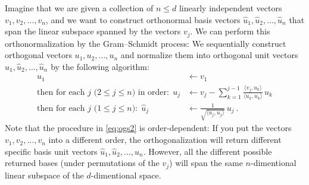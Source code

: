 \documentclass{article}
\newcommand{\inner}[2]{\langle{#1},{#2}\rangle}
\begin{document}
Imagine that we are given a collection of $n\leq d$ linearly independent vectors $v_1,v_2,\ldots,v_n$,
and we want to construct orthonormal basis vectors $\hat{u}_1,\hat{u}_2,\ldots,\hat{u}_n$ that span the linear subspace spanned by the vectors $v_j$.
We can perform this orthonormalization by the Gram--Schmidt process:
We sequentially construct orthogonal vectors $u_1,u_2,\ldots,u_n$ and normalize them into orthogonal unit vectors $\hat{u}_1,\hat{u}_2,\ldots,\hat{u}_n$ by the following algorithm:
\begin{align}
    u_1 &\leftarrow v_1 \label{eq:ogs1}
    \\
    \mbox{then for each $j$ ($2\leq j\leq n$) in order:} ~~ u_j &\leftarrow v_j - \sum_{k=1}^{j-1} \frac{\inner{v_j}{u_k}}{\inner{u_k}{u_k}}\,u_k \label{eq:ogs2}
    \\
    \mbox{then for each $j$ ($1\leq j\leq n$):} ~~ \hat{u}_j &\leftarrow \frac{1}{\sqrt{\inner{u_j}{u_j}}}\,u_j ~. \label{eq:ogs3}
\end{align}
Note that the procedure in \eqref{eq:ogs2} is order-dependent: If you put the vectors $v_1,v_2,\ldots,v_n$ into a different order, the orthogonalization will return different specific basis unit vectors $\hat{u}_1,\hat{u}_2,\ldots,\hat{u}_n$.
However, all the different possible returned bases (under permutations of the $v_j$) will span the same $n$-dimentional linear subspace of the $d$-dimentional space.
\end{document}
